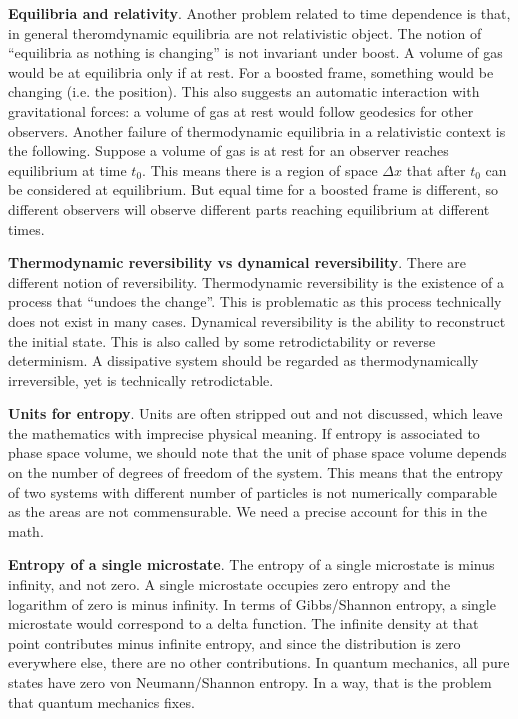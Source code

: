 \documentclass[10pt, onecolumn, longbibliography, nofootinbib]{revtex4-2}
\begin{document}
\textbf{Equilibria and relativity}. Another problem related to time dependence is that, in general theromdynamic equilibria are not relativistic object. The notion of ``equilibria as nothing is changing'' is not invariant under boost. A volume of gas would be at equilibria only if at rest. For a boosted frame, something would be changing (i.e. the position). This also suggests an automatic interaction with gravitational forces: a volume of gas at rest would follow geodesics for other observers. Another failure of thermodynamic equilibria in a relativistic context is the following. Suppose a volume of gas is at rest for an observer reaches equilibrium at time $t_0$. This means there is a region of space $\Delta x$ that after $t_0$ can be considered at equilibrium. But equal time for a boosted frame is different, so different observers will observe different parts reaching equilibrium at different times.

\textbf{Thermodynamic reversibility vs dynamical reversibility}. There are different notion of reversibility. Thermodynamic reversibility is the existence of a process that ``undoes the change''. This is problematic as this process technically does not exist in many cases. Dynamical reversibility is the ability to reconstruct the initial state. This is also called by some retrodictability or reverse determinism. A dissipative system should be regarded as thermodynamically irreversible, yet is technically retrodictable.

\textbf{Units for entropy}. Units are often stripped out and not discussed, which leave the mathematics with imprecise physical meaning. If entropy is associated to phase space volume, we should note that the unit of phase space volume depends on the number of degrees of freedom of the system. This means that the entropy of two systems with different number of particles is not numerically comparable as the areas are not commensurable. We need a precise account for this in the math.

\textbf{Entropy of a single microstate}. The entropy of a single microstate is minus infinity, and not zero. A single microstate occupies zero entropy and the logarithm of zero is minus infinity. In terms of Gibbs/Shannon entropy, a single microstate would correspond to a delta function. The infinite density at that point contributes minus infinite entropy, and since the distribution is zero everywhere else, there are no other contributions. In quantum mechanics, all pure states have zero von Neumann/Shannon entropy. In a way, that is the problem that quantum mechanics fixes.
\end{document}
